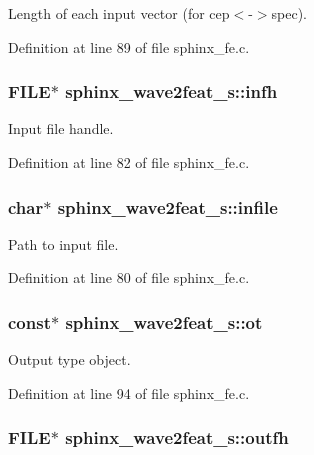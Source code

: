 Length of each input vector (for cep$<$-\/$>$spec). 



Definition at line 89 of file sphinx\-\_\-fe.\-c.

\subsubsection[{infh}]{\setlength{\rightskip}{0pt plus 5cm}F\-I\-L\-E$\ast$ sphinx\-\_\-wave2feat\-\_\-s\-::infh}\label{structsphinx__wave2feat__s_ad86834e597d4677aed93e7c06cebccb7}


Input file handle. 



Definition at line 82 of file sphinx\-\_\-fe.\-c.

\subsubsection[{infile}]{\setlength{\rightskip}{0pt plus 5cm}char$\ast$ sphinx\-\_\-wave2feat\-\_\-s\-::infile}\label{structsphinx__wave2feat__s_a6d4d1b1be4e3a3c1de82943e9e6fa65c}


Path to input file. 



Definition at line 80 of file sphinx\-\_\-fe.\-c.

\subsubsection[{ot}]{ const$\ast$ sphinx\-\_\-wave2feat\-\_\-s\-::ot}\label{structsphinx__wave2feat__s_a929e05e041ad922f6a2e35637a98c917}


Output type object. 



Definition at line 94 of file sphinx\-\_\-fe.\-c.

\subsubsection[{outfh}]{\setlength{\rightskip}{0pt plus 5cm}F\-I\-L\-E$\ast$ sphinx\-\_\-wave2feat\-\_\-s\-::outfh}\label{structsphinx__wave2feat__s_ad7340fab24fb182cbff2c73fd1fb3671}


